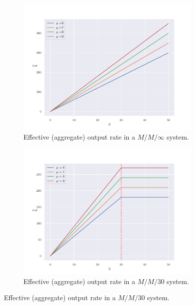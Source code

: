 \documentclass[11pt, a4paper]{report}
\begin{document}
\begin{figure}
    \begin{subfigure}[b]{0.55\textwidth}
        \centering
        \includegraphics[width=\textwidth]{plots/mmInf_output_rate.pdf}
        \caption{Effective (aggregate) output rate in a $M/M/\infty$ system.}
        \label{fig:mmInf_output_rate}
    \end{subfigure}
    \hfill
    \begin{subfigure}[b]{0.55\textwidth}
        \centering
        \includegraphics[width=\textwidth]{plots/mmm_output_rate.pdf}
        \caption{Effective (aggregate) output rate in a $M/M/30$ system.}
        \label{fig:mmm_output_rate}
    \end{subfigure}
    \label{fig:output_rates}
\end{figure}
\end{document}
